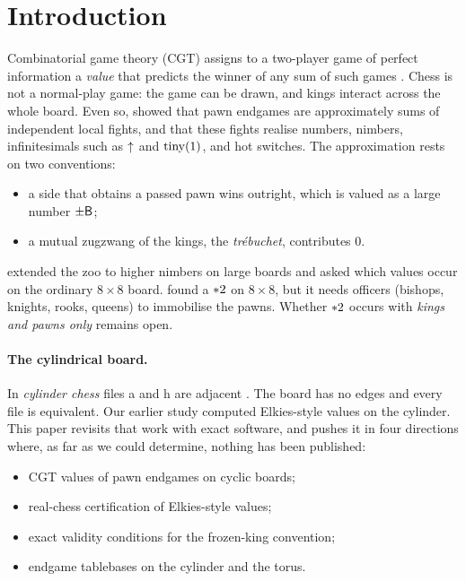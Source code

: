\section{Introduction}\label{sec:intro}

Combinatorial game theory (CGT) assigns to a two-player game of perfect information a \emph{value} that
predicts the winner of any sum of such games \citep{ONAG,WinningWays,Siegel2013}. Chess is not a normal-play
game: the game can be drawn, and kings interact across the whole board. Even so, \citet{Elkies1996} showed
that pawn endgames are approximately sums of independent local fights, and that these fights realise numbers,
nimbers, infinitesimals such as $\mathord{\uparrow}$ and $\operatorname{tiny}(1)$, and hot switches. The approximation rests on two
conventions:
\begin{itemize}
\item a side that obtains a passed pawn wins outright, which is valued as a large number $\pm\mathsf{B}$;
\item a mutual zugzwang of the kings, the \emph{tr\'ebuchet}, contributes $0$.
\end{itemize}
\citet{Elkies2002} extended the zoo to higher nimbers on large boards and asked which values occur on the
ordinary $8\times8$ board. \citet{DrummondCole2005} found a $\mathord{\ast 2}$ on $8\times8$, but it needs officers
(bishops, knights, rooks, queens) to immobilise the pawns. Whether $\mathord{\ast 2}$ occurs with \emph{kings and
pawns only} remains open.

\paragraph{The cylindrical board.}
In \emph{cylinder chess} files a and h are adjacent \citep{Pritchard}. The board has no edges and every file is
equivalent. Our earlier study \citep{Bhattacharjee2025} computed Elkies-style values on the cylinder. This
paper revisits that work with exact software, and pushes it in four directions where, as far as we could
determine, nothing has been published:
\begin{itemize}
\item CGT values of pawn endgames on cyclic boards;
\item real-chess certification of Elkies-style values;
\item exact validity conditions for the frozen-king convention;
\item endgame tablebases on the cylinder and the torus.
\end{itemize}

